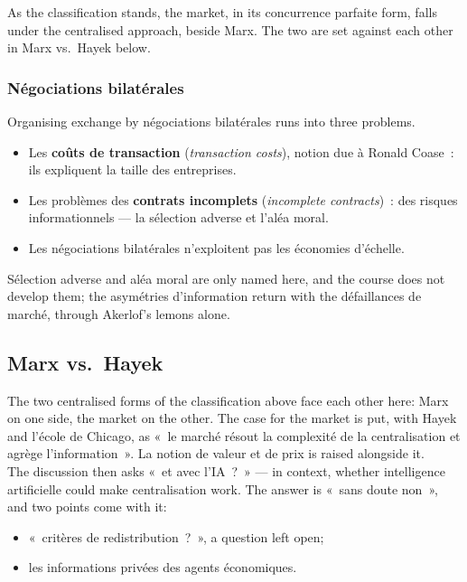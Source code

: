 As the classification stands, the market, in its concurrence parfaite form, falls
under the centralised approach, beside Marx. The two are set against each other in
Marx vs.\ Hayek below.

\subsubsection{Négociations bilatérales}

Organising exchange by négociations bilatérales runs into three problems.

\begin{itemize}
  \item Les \textbf{coûts de transaction} (\textit{transaction costs}), notion due à
    Ronald Coase~: ils expliquent la taille des entreprises.
  \item Les problèmes des \textbf{contrats incomplets} (\textit{incomplete
    contracts})~: des risques informationnels --- la sélection adverse et l'aléa
    moral.
  \item Les négociations bilatérales n'exploitent pas les économies d'échelle.
\end{itemize}

Sélection adverse and aléa moral are only named here, and the course does not
develop them; the asymétries d'information return with the défaillances de marché,
through Akerlof's lemons alone.

\subsection{Marx vs.\ Hayek}

The two centralised forms of the classification above face each other here: Marx
on one side, the market on the other. The case for the market is put, with
Hayek and l'école de Chicago, as «~le marché résout la complexité de la
centralisation et agrège l'information~». La notion de valeur et de prix is raised
alongside it.\\

The discussion then asks «~et avec l'IA~?~» --- in context, whether intelligence
artificielle could make centralisation work. The answer is «~sans doute non~», and
two points come with it:

\begin{itemize}
  \item «~critères de redistribution~?~», a question left open;
  \item les informations privées des agents économiques.
\end{itemize}
